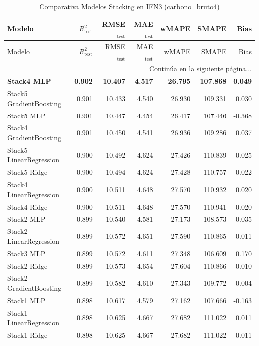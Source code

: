 \begin{longtable}{lrrrrrr}
    \caption{Comparativa Modelos Stacking en IFN3 (carbono_bruto4)}
    \label{tab:stack_comp_ifn3_carbono_bruto4} \\
    \toprule
    Modelo & $R^2_{\text{test}}$ & RMSE$_{\text{test}}$ & MAE$_{\text{test}}$ & wMAPE & SMAPE & Bias \\
    \midrule
    \endfirsthead
    \toprule
    Modelo & $R^2_{\text{test}}$ & RMSE$_{\text{test}}$ & MAE$_{\text{test}}$ & wMAPE & SMAPE & Bias \\
    \midrule
    \endhead
    \midrule
    \multicolumn{7}{r}{{Continúa en la siguiente página...}} \\
    \endfoot
    \bottomrule
    \endlastfoot
    \textbf{Stack4 MLP} & \textbf{0.902} & \textbf{10.407} & \textbf{4.517} & \textbf{26.795} & \textbf{107.868} & \textbf{0.049} \\
    Stack5 GradientBoosting & 0.901 & 10.433 & 4.540 & 26.930 & 109.331 & 0.030 \\
    Stack5 MLP & 0.901 & 10.447 & 4.454 & 26.417 & 107.446 & -0.368 \\
    Stack4 GradientBoosting & 0.901 & 10.450 & 4.541 & 26.936 & 109.286 & 0.037 \\
    Stack5 LinearRegression & 0.900 & 10.492 & 4.624 & 27.426 & 110.839 & 0.025 \\
    Stack5 Ridge & 0.900 & 10.494 & 4.624 & 27.428 & 110.757 & 0.022 \\
    Stack4 LinearRegression & 0.900 & 10.511 & 4.648 & 27.570 & 110.932 & 0.020 \\
    Stack4 Ridge & 0.900 & 10.511 & 4.648 & 27.570 & 110.941 & 0.020 \\
    Stack2 MLP & 0.899 & 10.540 & 4.581 & 27.173 & 108.573 & -0.035 \\
    Stack2 LinearRegression & 0.899 & 10.572 & 4.651 & 27.590 & 110.865 & 0.011 \\
    Stack3 MLP & 0.899 & 10.572 & 4.611 & 27.348 & 106.609 & 0.170 \\
    Stack2 Ridge & 0.899 & 10.573 & 4.654 & 27.604 & 110.866 & 0.010 \\
    Stack2 GradientBoosting & 0.899 & 10.582 & 4.610 & 27.343 & 109.772 & 0.004 \\
    Stack1 MLP & 0.898 & 10.617 & 4.579 & 27.162 & 107.666 & -0.163 \\
    Stack1 LinearRegression & 0.898 & 10.625 & 4.667 & 27.682 & 111.022 & 0.011 \\
    Stack1 Ridge & 0.898 & 10.625 & 4.667 & 27.682 & 111.022 & 0.011 \\

\end{longtable}
